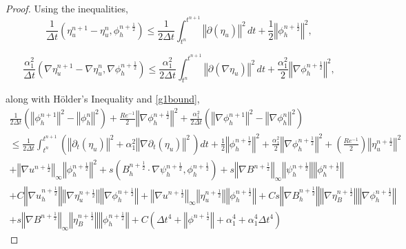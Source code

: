\documentclass[11pt]{article}%
\numberwithin{equation}{section}
\newcommand{\norm}[1]{\left\Vert#1\right\Vert}
\def\grad{{\nabla}}
\def\nplushalf{{n+\frac12}}
\begin{document}
\begin{proof}
	Using the inequalities,
	\begin{equation}
	\frac{1}{\Delta t}(\eta^{n+1}_{u} - \eta^{n}_{u},\phi^{\nplushalf}_{h}) \leq \frac{1}{2\Delta t}\int^{t^{n+1}}_{t^{n}} \norm{\partial(\eta_{u})}^{2}\, dt + \frac{1}{2}\norm{\phi^{\nplushalf}_{h}}^{2},
	\label{eq:3.49}
	\end{equation}

	\begin{equation}
	\frac{\alpha_1^2}{\Delta t}(\grad{\eta}^{n+1}_{u} - \grad{\eta}^{n}_{u},\grad{\phi}^{\nplushalf}_{h}) \leq \frac{\alpha_1^2}{2\Delta t}\int^{t^{n+1}}_{t^{n}} \norm{\partial(\grad{\eta}_{u})}^{2}\, dt + \frac{\alpha_1^2}{2}\norm{\grad{\phi}^{\nplushalf}_{h}}^{2},
	\label{eq:3.49}
	\end{equation}
	
	\noindent along with H\"{o}lder's Inequality and \eqref{g1bound},
	\begin{multline}
	\frac{1}{2\Delta t}(\norm{\phi^{n+1}_{h}}^{2} - \norm{\phi^{n}_{h}}^{2})  + \frac{Re^{-1}}{2}\norm{\nabla \phi^{\nplushalf}_{h}}^{2}+\frac{\alpha_1^2}{2\Delta t}(\norm{\grad{\phi}^{n+1}_{h}}^{2} - \norm{\grad{\phi}^{n}_{h}}^{2}) \\
	\leq \frac{1}{2\Delta t}\int^{t^{n+1}}_{t^{n}} (\norm{\partial_{t}(\eta_{u})}^{2}+\alpha_1^2\norm{\grad{\partial_{t}(\eta_{u})}}^{2}\, )dt + \frac{1}{2}\norm{\phi^{\nplushalf}_{h}}^{2}+\frac{\alpha_1^2}{2}\norm{\grad{\phi}^{\nplushalf}_{h}}^{2} + \left(\frac{Re^{-1}}{2}\right)\norm{\eta^{\nplushalf}_{u}}^{2} \\
	+ \norm{\nabla u^{\nplushalf}}_{\infty}\norm{\phi_h^{\nplushalf}}^2
	+ s(B_h^{\nplushalf}\cdot\nabla \psi_h^{\nplushalf},\phi_h^{\nplushalf})
	+ s\norm{\nabla B^{\nplushalf}}_{\infty}\norm{\psi_h^{\nplushalf}}\norm{\phi_h^{\nplushalf}} \\
	+ C\norm{\nabla u_h^{\nplushalf}}\norm{\nabla \eta_u^{\nplushalf}}\norm{\nabla \phi_h^{\nplushalf}}
	+ \norm{\nabla u^{\nplushalf}}_{\infty}\norm{\eta_u^{\nplushalf}}\norm{\phi_h^{\nplushalf}}
         + Cs\norm{\nabla B_h^{\nplushalf}}\norm{\nabla \eta_B^{\nplushalf}}\norm{\nabla \phi_h^{\nplushalf}} \\
         + s\norm{\nabla B^{\nplushalf}}_{\infty}\norm{\eta_B^{\nplushalf}}\norm{\phi_h^{\nplushalf}}
         +C\left(\Delta t^4 + \norm{\phi^{\nplushalf}} + \alpha_1^4 + \alpha_1^4 \Delta t^4\right)
	\label{eq:3.50}
	\end{multline}
	

\end{proof}
\end{document}
